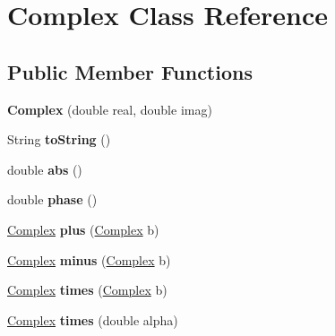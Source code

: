 \hypertarget{class_complex}{}\section{Complex Class Reference}
\label{class_complex}
\subsection*{Public Member Functions}
\begin{DoxyCompactItemize}
\item 
\hypertarget{class_complex_a6c6c07b34e6405445c264e11b47ccd43}{}{\bfseries Complex} (double real, double imag)\label{class_complex_a6c6c07b34e6405445c264e11b47ccd43}

\item 
\hypertarget{class_complex_a5a14ebec63aae370f2a05522e2c45453}{}String {\bfseries to\+String} ()\label{class_complex_a5a14ebec63aae370f2a05522e2c45453}

\item 
\hypertarget{class_complex_ad223eb3132189c3a0612249e78d337b5}{}double {\bfseries abs} ()\label{class_complex_ad223eb3132189c3a0612249e78d337b5}

\item 
\hypertarget{class_complex_a6c310c2a56601bf96ac682dd116fc8a0}{}double {\bfseries phase} ()\label{class_complex_a6c310c2a56601bf96ac682dd116fc8a0}

\item 
\hypertarget{class_complex_ac2c81dfbe734c25f94b2366ed451a986}{}\hyperlink{class_complex}{Complex} {\bfseries plus} (\hyperlink{class_complex}{Complex} b)\label{class_complex_ac2c81dfbe734c25f94b2366ed451a986}

\item 
\hypertarget{class_complex_afdf45232d33d711205be87bad5fae175}{}\hyperlink{class_complex}{Complex} {\bfseries minus} (\hyperlink{class_complex}{Complex} b)\label{class_complex_afdf45232d33d711205be87bad5fae175}

\item 
\hypertarget{class_complex_add864ec586b1fb6282b05197b7524617}{}\hyperlink{class_complex}{Complex} {\bfseries times} (\hyperlink{class_complex}{Complex} b)\label{class_complex_add864ec586b1fb6282b05197b7524617}

\item 
\hypertarget{class_complex_ab4b2c25339b9e0adb90380726877e42e}{}\hyperlink{class_complex}{Complex} {\bfseries times} (double alpha)\label{class_complex_ab4b2c25339b9e0adb90380726877e42e}


\end{DoxyCompactItemize}
